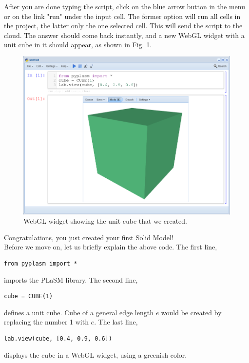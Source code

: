 \documentclass{article}
\begin{document}
After you are done typing the script, click on the blue arrow button in the menu 
or on the link "run" under the input cell. The former option will run all cells 
in the project, the latter only the one selected cell. This will send the script to the cloud. 
The answer should come back instantly, and a new WebGL widget with a unit cube 
in it should appear, as shown in Fig. \ref{fig:cube}. 

\begin{figure}[!ht]
\begin{center}
\includegraphics[width=\textwidth]{img/cube.png}
\end{center}
\caption{WebGL widget showing the unit cube that we created.}
\label{fig:cube}
\end{figure}
\noindent
Congratulations, you just 
created your first Solid Model!\\

\noindent
Before we move on, let us briefly explain the above code.
The first line, 

\begin{verbatim}
from pyplasm import *
\end{verbatim}
imports the PLaSM library. The second line,

\begin{verbatim}
cube = CUBE(1)
\end{verbatim}
defines a unit cube. Cube of a general edge length $e$ would be 
created by replacing the number 1 with $e$. The last line,

\begin{verbatim}
lab.view(cube, [0.4, 0.9, 0.6])
\end{verbatim}
displays the cube in a WebGL widget, using a greenish color. 
\end{document}
